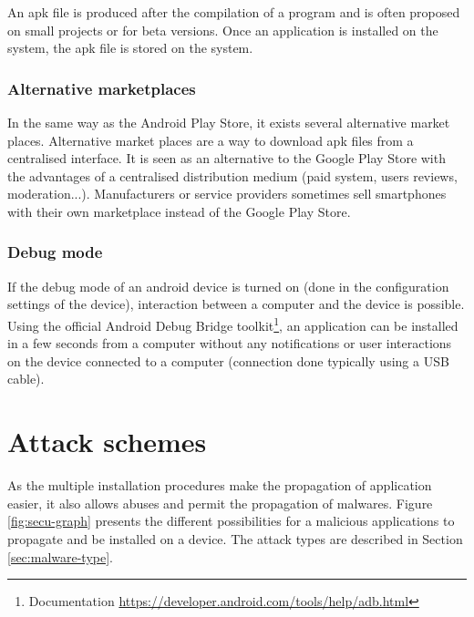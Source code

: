 An apk file is produced after the compilation of a program and is often proposed on small projects or for beta versions.
Once an application is installed on the system, the apk file is stored on the system.

\subsubsection{Alternative marketplaces}
In the same way as the Android Play Store, it exists several alternative market places.
Alternative market places are a way to download apk files from a centralised interface.
It is seen as an alternative to the Google Play Store with the advantages of a centralised distribution medium (paid system, users reviews, moderation...).
Manufacturers or service providers sometimes sell smartphones with their own marketplace instead of the Google Play Store.\\


\subsubsection{Debug mode}
If the debug mode of an android device is turned on (done in the configuration settings of the device), interaction between a computer and the device is possible.
Using the official Android Debug Bridge toolkit\footnote{Documentation \url{https://developer.android.com/tools/help/adb.html}}, an application can be installed in a few seconds from a computer without any notifications or user interactions on the device connected to a computer (connection done typically using a USB cable).

\section{Attack schemes}

As the multiple installation procedures make the propagation of application easier, it also allows abuses and permit the propagation of malwares.
Figure \ref{fig:secu-graph} presents the different possibilities for a malicious applications to propagate and be installed on a device.
The attack types are described in Section \ref{sec:malware-type}.

